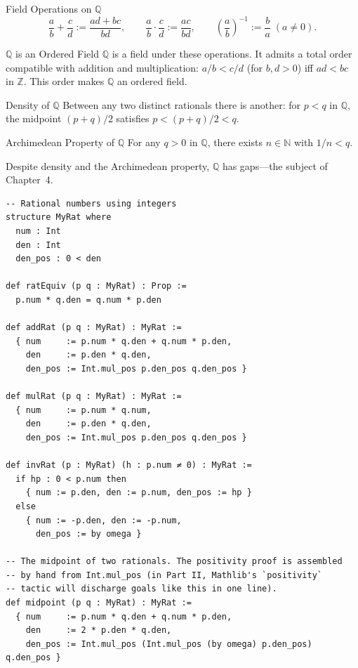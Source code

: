 \documentclass[12pt, openany]{book}
\theoremstyle{plain}
\theoremstyle{definition}
\theoremstyle{remark}
\newcommand{\N}{\mathbb{N}}
\newcommand{\Z}{\mathbb{Z}}
\newcommand{\Q}{\mathbb{Q}}
\begin{document}
\begin{defbox}{Field Operations on $\Q$}
\[ \frac{a}{b} + \frac{c}{d} := \frac{ad+bc}{bd}, \qquad \frac{a}{b} \cdot \frac{c}{d} := \frac{ac}{bd}, \qquad \left(\frac{a}{b}\right)^{-1} := \frac{b}{a}\; (a \neq 0). \]
\end{defbox}
\color{black}

\begin{thmbox}{$\Q$ is an Ordered Field}
$\Q$ is a field under these operations. It admits a total order compatible with addition and multiplication: $a/b < c/d$ (for $b, d > 0$) iff $ad < bc$ in $\Z$. This order makes $\Q$ an ordered field.
\end{thmbox}
\color{black}

\begin{thmbox}{Density of $\Q$}
Between any two distinct rationals there is another: for $p < q$ in $\Q$, the midpoint $(p+q)/2$ satisfies $p < (p+q)/2 < q$.
\end{thmbox}
\color{black}

\begin{thmbox}{Archimedean Property of $\Q$}
For any $q > 0$ in $\Q$, there exists $n \in \N$ with $1/n < q$.
\end{thmbox}
\color{black}

Despite density and the Archimedean property, $\Q$ has gaps---the subject of Chapter~4.

\begin{leanbox}
\begin{lstlisting}
-- Rational numbers using integers
structure MyRat where
  num : Int
  den : Int
  den_pos : 0 < den

def ratEquiv (p q : MyRat) : Prop :=
  p.num * q.den = q.num * p.den

def addRat (p q : MyRat) : MyRat :=
  { num     := p.num * q.den + q.num * p.den,
    den     := p.den * q.den,
    den_pos := Int.mul_pos p.den_pos q.den_pos }

def mulRat (p q : MyRat) : MyRat :=
  { num     := p.num * q.num,
    den     := p.den * q.den,
    den_pos := Int.mul_pos p.den_pos q.den_pos }

def invRat (p : MyRat) (h : p.num ≠ 0) : MyRat :=
  if hp : 0 < p.num then
    { num := p.den, den := p.num, den_pos := hp }
  else
    { num := -p.den, den := -p.num,
      den_pos := by omega }

-- The midpoint of two rationals. The positivity proof is assembled
-- by hand from Int.mul_pos (in Part II, Mathlib's `positivity`
-- tactic will discharge goals like this in one line).
def midpoint (p q : MyRat) : MyRat :=
  { num     := p.num * q.den + q.num * p.den,
    den     := 2 * p.den * q.den,
    den_pos := Int.mul_pos (Int.mul_pos (by omega) p.den_pos) q.den_pos }
\end{lstlisting}
\end{leanbox}
\color{black}
\end{document}
